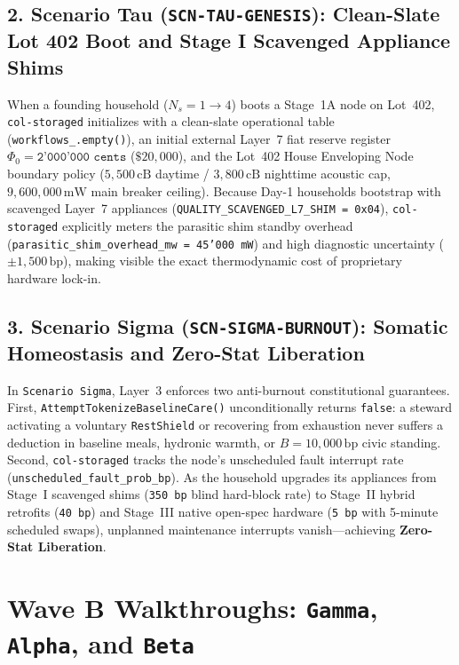 \subsection{2. Scenario Tau (\texttt{SCN-TAU-GENESIS}): Clean-Slate Lot 402 Boot and Stage I Scavenged Appliance Shims}
When a founding household ($N_s = 1 \to 4$) boots a Stage~1A node on Lot~402, \texttt{col-storaged} initializes with a clean-slate operational table (\texttt{workflows\_.empty()}), an initial external Layer~7 fiat reserve register $\Phi_0 = \texttt{2'000'000 cents}$ ($\$20{,}000$), and the Lot~402 House Enveloping Node boundary policy ($5{,}500\,\mathrm{cB}$ daytime / $3{,}800\,\mathrm{cB}$ nighttime acoustic cap, $9{,}600{,}000\,\mathrm{mW}$ main breaker ceiling). Because Day-1 households bootstrap with scavenged Layer~7 appliances (\texttt{QUALITY\_SCAVENGED\_L7\_SHIM = 0x04}), \texttt{col-storaged} explicitly meters the parasitic shim standby overhead (\texttt{parasitic\_shim\_overhead\_mw = 45'000 mW}) and high diagnostic uncertainty ($\pm 1{,}500\,\mathrm{bp}$), making visible the exact thermodynamic cost of proprietary hardware lock-in.

\subsection{3. Scenario Sigma (\texttt{SCN-SIGMA-BURNOUT}): Somatic Homeostasis and Zero-Stat Liberation}
In \texttt{Scenario Sigma}, Layer~3 enforces two anti-burnout constitutional guarantees. First, \texttt{AttemptTokenizeBaselineCare()} unconditionally returns \texttt{false}: a steward activating a voluntary \texttt{RestShield} or recovering from exhaustion never suffers a deduction in baseline meals, hydronic warmth, or $B = 10{,}000\,\mathrm{bp}$ civic standing. Second, \texttt{col-storaged} tracks the node's unscheduled fault interrupt rate (\texttt{unscheduled\_fault\_prob\_bp}). As the household upgrades its appliances from Stage~I scavenged shims (\texttt{350 bp} blind hard-block rate) to Stage~II hybrid retrofits (\texttt{40 bp}) and Stage~III native open-spec hardware (\texttt{5 bp} with 5-minute scheduled swaps), unplanned maintenance interrupts vanish---achieving \textbf{Zero-Stat Liberation}.

\section{Wave B Walkthroughs: \texttt{Gamma}, \texttt{Alpha}, and \texttt{Beta}}
\label{sec:ch10-wave-b}

